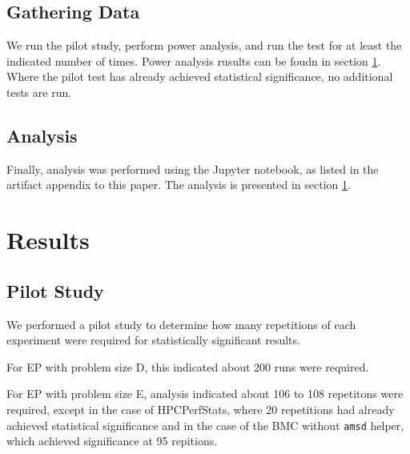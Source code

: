 \documentclass[conference]{IEEEtran}
\begin{document}
\subsection{Gathering Data}



We run the pilot study, perform power analysis, and run the test for at least 
the indicated number of times. Power analysis rusults can be foudn in section 
\ref{results}. Where the pilot test has already achieved statistical 
significance, no additional tests are run.

\subsection{Analysis}

Finally, analysis was performed using the Jupyter notebook, as listed in the 
artifact appendix to this paper. The analysis is presented in section 
\ref{results}.

\section{Results} \label{results}

\subsection{Pilot Study}

We performed a pilot study to determine how many repetitions of each experiment 
were required for statistically significant results. 

For EP with problem size D, 
this indicated about 200 runs were required.

For EP with problem size E, analysis indicated about 106 to 108 repetitons were 
required, except in the case of HPCPerfStats, where 20 repetitions had already 
achieved statistical significance and in the case of the BMC without 
\texttt{amsd} helper, which achieved significance at 95 repitions.
\end{document}
